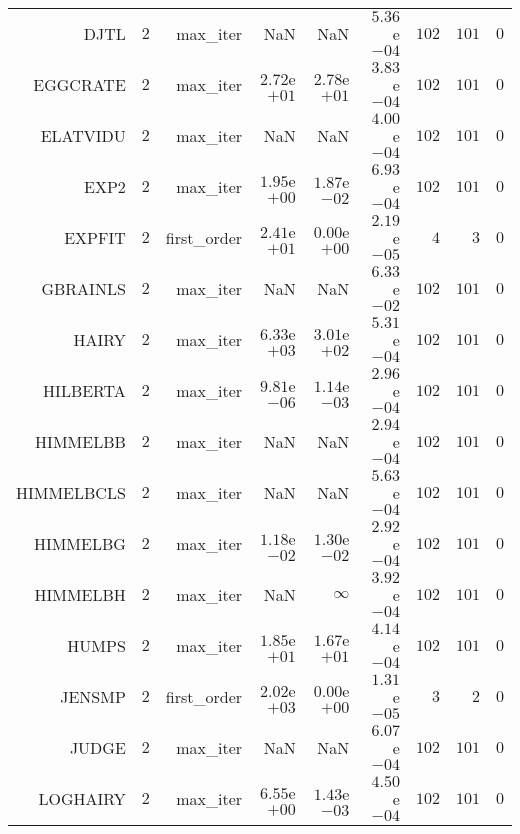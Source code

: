 \begin{longtable}{rrrrrrrrr}
DJTL & \(     2\) & max\_iter &       NaN &       NaN & \( 5.36\)e\(-04\) & \(   102\) & \(   101\) & \(     0\) \\
EGGCRATE & \(     2\) & max\_iter & \( 2.72\)e\(+01\) & \( 2.78\)e\(+01\) & \( 3.83\)e\(-04\) & \(   102\) & \(   101\) & \(     0\) \\
ELATVIDU & \(     2\) & max\_iter &       NaN &       NaN & \( 4.00\)e\(-04\) & \(   102\) & \(   101\) & \(     0\) \\
EXP2 & \(     2\) & max\_iter & \( 1.95\)e\(+00\) & \( 1.87\)e\(-02\) & \( 6.93\)e\(-04\) & \(   102\) & \(   101\) & \(     0\) \\
EXPFIT & \(     2\) & first\_order & \( 2.41\)e\(+01\) & \( 0.00\)e\(+00\) & \( 2.19\)e\(-05\) & \(     4\) & \(     3\) & \(     0\) \\
GBRAINLS & \(     2\) & max\_iter &       NaN &       NaN & \( 6.33\)e\(-02\) & \(   102\) & \(   101\) & \(     0\) \\
HAIRY & \(     2\) & max\_iter & \( 6.33\)e\(+03\) & \( 3.01\)e\(+02\) & \( 5.31\)e\(-04\) & \(   102\) & \(   101\) & \(     0\) \\
HILBERTA & \(     2\) & max\_iter & \( 9.81\)e\(-06\) & \( 1.14\)e\(-03\) & \( 2.96\)e\(-04\) & \(   102\) & \(   101\) & \(     0\) \\
HIMMELBB & \(     2\) & max\_iter &       NaN &       NaN & \( 2.94\)e\(-04\) & \(   102\) & \(   101\) & \(     0\) \\
HIMMELBCLS & \(     2\) & max\_iter &       NaN &       NaN & \( 5.63\)e\(-04\) & \(   102\) & \(   101\) & \(     0\) \\
HIMMELBG & \(     2\) & max\_iter & \( 1.18\)e\(-02\) & \( 1.30\)e\(-02\) & \( 2.92\)e\(-04\) & \(   102\) & \(   101\) & \(     0\) \\
HIMMELBH & \(     2\) & max\_iter &       NaN & \(\infty\) & \( 3.92\)e\(-04\) & \(   102\) & \(   101\) & \(     0\) \\
HUMPS & \(     2\) & max\_iter & \( 1.85\)e\(+01\) & \( 1.67\)e\(+01\) & \( 4.14\)e\(-04\) & \(   102\) & \(   101\) & \(     0\) \\
JENSMP & \(     2\) & first\_order & \( 2.02\)e\(+03\) & \( 0.00\)e\(+00\) & \( 1.31\)e\(-05\) & \(     3\) & \(     2\) & \(     0\) \\
JUDGE & \(     2\) & max\_iter &       NaN &       NaN & \( 6.07\)e\(-04\) & \(   102\) & \(   101\) & \(     0\) \\
LOGHAIRY & \(     2\) & max\_iter & \( 6.55\)e\(+00\) & \( 1.43\)e\(-03\) & \( 4.50\)e\(-04\) & \(   102\) & \(   101\) & \(     0\) \\

\end{longtable}
